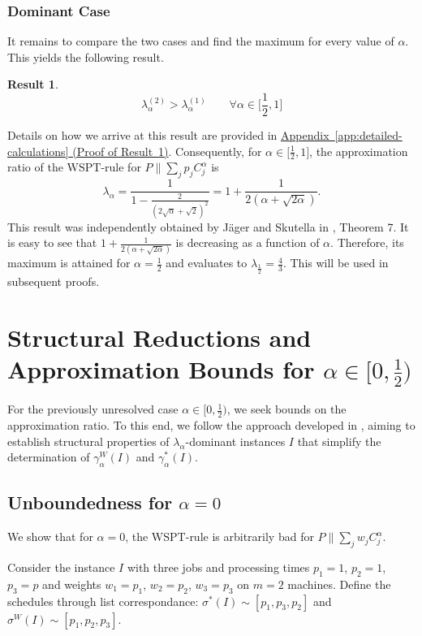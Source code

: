 \documentclass[%
english, titlepage=false %
]{./tum-templates/book/tumbook}
\newtheorem{result}{Result}
\newcommand{\Problem}{P\!\parallel\!\sum_j p_j C^{\alpha}_j}
\begin{document}
\subsection*{Dominant Case}
It remains to compare the two cases and find the 
maximum for every value of $\alpha$.
This yields the following result.
\begin{result}\label{Res:Case-Comp}
\[
\boxed{
\lambda_{\alpha}^{(2)}>\lambda_{\alpha}^{(1)} \qquad \forall \alpha \in \Bigg[\frac12,1\Bigg]
}
\]
\end{result}
Details on how we arrive at this result are provided in \hyperref[app:proof-cases]
{Appendix~\ref*{app:detailed-calculations}
(Proof of Result~\ref*{Res:Case-Comp})}.
Consequently, for \(\alpha \in \Big[\frac12,1\Big]\), the approximation ratio of the \(\mathrm{WSPT}\)-rule for $\Problem$ is
\[
\lambda_{\alpha} = \frac{1}{1-\frac{2}{(2\sqrt{\alpha}+\sqrt{2})^2}} = 1+\frac{1}{2(\alpha+\sqrt{2\alpha})}.
\]
This result was independently obtained by Jäger and Skutella in \cite{JaegerSkutella2018}, Theorem 7.
It is easy to see that $1+\frac{1}{2(\alpha+\sqrt{2\alpha})}$ is decreasing as a function of $\alpha$. 
Therefore, its maximum is attained for $\alpha =\frac12$ and evaluates to $\lambda_{\frac12}=\frac43$. 
This will be used in subsequent proofs.



\chapter{Structural Reductions and Approximation Bounds for
\texorpdfstring{$\alpha \in \Big[0,\frac12\Big)$}{alpha in [0,1/2)}}\label{chap:alpha_l}

For the previously unresolved case $\alpha \in [0,\frac12)$, we seek
bounds on the approximation ratio. To this end, we follow the approach
developed in \cite{Schwiegelshohn:2011}, aiming to establish structural
properties of $\lambda_{\alpha}$-dominant instances $I$ that simplify
the determination of $\gamma_{\alpha}^W(I)$ and $\gamma_{\alpha}^*(I)$.


\section{Unboundedness for \texorpdfstring{$\alpha = 0$}{alpha equals 0}}\label{sec: alpha zero}
We show that for $\alpha=0$, the $\mathrm{WSPT}$-rule is arbitrarily bad for $P \!\parallel\! \sum_{j} w_j C_j^{\alpha}$.\medskip

Consider the instance $I$ with three jobs and processing times $p_1 =1$, $p_2=1$, $p_3=p$ and weights
$w_1 =p_1$, $w_2=p_2$, $w_3=p_3$ on $m=2$ machines.
Define the schedules through list correspondance:  $\sigma^{*}(I) \sim [p_1,p_3,p_2]$ and $\sigma^{W}(I) \sim [p_1,p_2,p_3]$.
\end{document}
